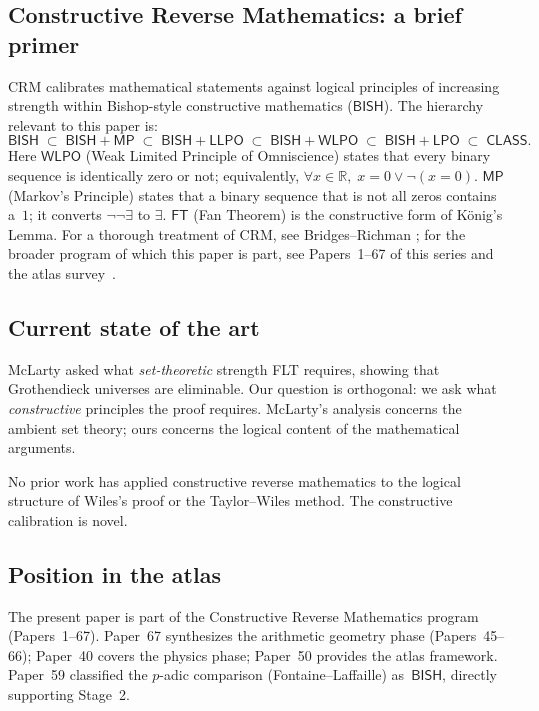 \documentclass[11pt]{article}
\theoremstyle{plain}
\theoremstyle{definition}
\theoremstyle{remark}
\newcommand{\R}{\mathbb{R}}
\newcommand{\CRM}{\mathrm{CRM}}
\newcommand{\BISH}{\mathsf{BISH}}
\newcommand{\LPO}{\mathsf{LPO}}
\newcommand{\WLPO}{\mathsf{WLPO}}
\newcommand{\LLPO}{\mathsf{LLPO}}
\newcommand{\MP}{\mathsf{MP}}
\newcommand{\FT}{\mathsf{FT}}
\newcommand{\CLASS}{\mathsf{CLASS}}
\begin{document}
\subsection{Constructive Reverse Mathematics: a brief primer}

$\CRM$ calibrates mathematical statements against logical principles
of increasing strength within Bishop-style constructive mathematics
($\BISH$).  The hierarchy relevant to this paper is:
\[
  \BISH \;\subset\; \BISH + \MP \;\subset\; \BISH + \LLPO \;\subset\;
  \BISH + \WLPO \;\subset\; \BISH + \LPO \;\subset\; \CLASS.
\]
Here $\WLPO$ (Weak Limited Principle of Omniscience) states that
every binary sequence is identically zero or not; equivalently,
$\forall x \in \R,\; x = 0 \lor \lnot(x = 0)$.  $\MP$ (Markov's
Principle) states that a binary sequence that is not all zeros
contains a~$1$; it converts $\lnot\lnot\exists$ to $\exists$.
$\FT$ (Fan Theorem) is the constructive form of K\"onig's Lemma.
For a thorough treatment of $\CRM$, see Bridges--Richman
\cite{BridgesRichman1987}; for the broader program of which this
paper is part, see Papers~1--67 of this series and the atlas
survey~\cite{Paper50}.

\subsection{Current state of the art}

McLarty \cite{McLarty2010} asked what \emph{set-theoretic} strength
FLT requires, showing that Grothendieck universes are eliminable.
Our question is orthogonal: we ask what \emph{constructive}
principles the proof requires.  McLarty's analysis concerns the
ambient set theory; ours concerns the logical content of the
mathematical arguments.

No prior work has applied constructive reverse mathematics to the
logical structure of Wiles's proof or the Taylor--Wiles method.
The constructive calibration is novel.

\subsection{Position in the atlas}

The present paper is part of the Constructive Reverse Mathematics
program (Papers~1--67).  Paper~67 \cite{Paper67} synthesizes the
arithmetic geometry phase (Papers~45--66); Paper~40 \cite{Paper40}
covers the physics phase; Paper~50 \cite{Paper50} provides the
atlas framework.  Paper~59 \cite{Paper59} classified the $p$-adic
comparison (Fontaine--Laffaille) as~$\BISH$, directly supporting
Stage~2.
\end{document}
